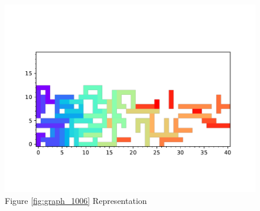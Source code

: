 \documentclass{standalone}
\begin{document}
\begin{figure}[!htb]
	\caption{Figure \ref{fig:graph_1006} Representation}
	\label{fig:picture_1006}
	\includegraphics[width=\textwidth]{../graphs/picture/1006.pdf}
\end{figure}
\end{document}
